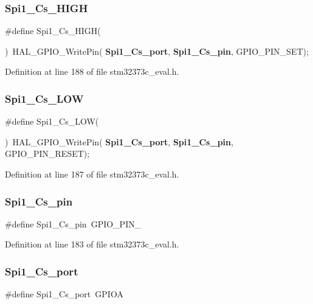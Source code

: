 \subsubsection{Spi1\+\_\+\+Cs\+\_\+\+H\+I\+GH}
{\footnotesize\ttfamily \#define Spi1\+\_\+\+Cs\+\_\+\+H\+I\+GH(\begin{DoxyParamCaption}{ }\end{DoxyParamCaption})~H\+A\+L\+\_\+\+G\+P\+I\+O\+\_\+\+Write\+Pin(\textbf{ Spi1\+\_\+\+Cs\+\_\+port},\textbf{ Spi1\+\_\+\+Cs\+\_\+pin}, G\+P\+I\+O\+\_\+\+P\+I\+N\+\_\+\+S\+ET);}



Definition at line 188 of file stm32373c\+\_\+eval.\+h.

\mbox{\label{group___l_e_d_ga7a99dcefe3cfc765860ba2271fb12f52}} 
\subsubsection{Spi1\+\_\+\+Cs\+\_\+\+L\+OW}
{\footnotesize\ttfamily \#define Spi1\+\_\+\+Cs\+\_\+\+L\+OW(\begin{DoxyParamCaption}{ }\end{DoxyParamCaption})~H\+A\+L\+\_\+\+G\+P\+I\+O\+\_\+\+Write\+Pin(\textbf{ Spi1\+\_\+\+Cs\+\_\+port},\textbf{ Spi1\+\_\+\+Cs\+\_\+pin}, G\+P\+I\+O\+\_\+\+P\+I\+N\+\_\+\+R\+E\+S\+ET);}



Definition at line 187 of file stm32373c\+\_\+eval.\+h.

\mbox{\label{group___l_e_d_ga6b2a647fb654d9b2faa1c0fa35791762}} 
\subsubsection{Spi1\+\_\+\+Cs\+\_\+pin}
{\footnotesize\ttfamily \#define Spi1\+\_\+\+Cs\+\_\+pin~G\+P\+I\+O\+\_\+\+P\+I\+N\+\_}



Definition at line 183 of file stm32373c\+\_\+eval.\+h.

\mbox{\label{group___l_e_d_gaae301ffb8d9f2bd672c2ecbf0b84b339}} 
\subsubsection{Spi1\+\_\+\+Cs\+\_\+port}
{\footnotesize\ttfamily \#define Spi1\+\_\+\+Cs\+\_\+port~G\+P\+I\+OA}



